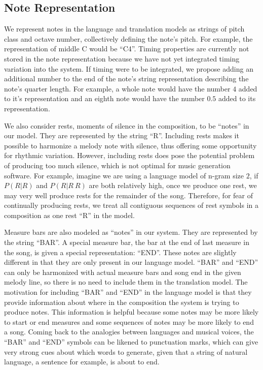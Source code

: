 \documentclass{sig-alternate}
\begin{document}
\subsection{Note Representation}
We represent notes in the language and translation models as strings of pitch class and octave number, collectively defining the note's pitch. For example, the representation of middle C would be ``C4''. Timing properties are currently not stored in the note representation because we have not yet integrated timing variation into the system. If timing were to be integrated, we propose adding an additional number to the end of the note's string representation describing the note's quarter length. For example, a whole note would have the number $4$ added to it's representation and an eighth note would have the number $0.5$ added to its representation. 

We also consider rests, moments of silence in the composition, to be ``notes'' in our model. They are represented by the string ``R''. Including rests makes it possible to harmonize a melody note with silence, thus offering some opportunity for rhythmic variation. However, including rests does pose the potential problem of producing too much silence, which is not optimal for music generation software. For example, imagine we are using a language model of n-gram size $2$, if $P(R | R)$ and $P (R | R\ R)$ are both relatively high, once we produce one rest, we may very well produce rests for the remainder of the song. Therefore, for fear of continually producing rests, we treat all contiguous sequences of rest symbols in a composition as one rest ``R'' in the model.

Measure bars are also modeled as ``notes'' in our system. They are represented by the string ``BAR''. A special measure bar, the bar at the end of last measure in the song, is given a special representation: ``END''. These notes are slightly different in that they are only present in our language model. ``BAR'' and ``END'' can only be harmonized with actual measure bars and song end in the given melody line, so there is no need to include them in the translation model. The motivation for including ``BAR'' and ``END'' in the language model is that they provide information about where in the composition the system is trying to produce notes. This information is helpful because some notes may be more likely to start or end measures and some sequences of notes may be more likely to end a song. Coming back to the analogies between languages and musical voices, the ``BAR'' and ``END'' symbols can be likened to punctuation marks, which can give very strong cues about which words to generate, given that a string of natural language, a sentence for example, is about to end.
\end{document}
